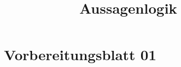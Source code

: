 \documentclass[]{uebungsblatt}
\title{Aussagenlogik}
\begin{document}
    \maketitle
    \makepreamble
    
    \section*{Vorbereitungsblatt 01}
    
    
    \newpage
    
    \begin{solutions}
        
    \end{solutions}
    
    \newpage
    
    \makehints
\end{document}

